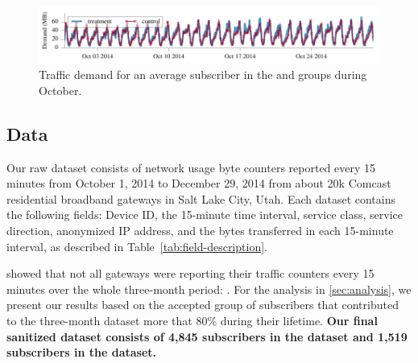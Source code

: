 \begin{figure}[t]
\centering
\includegraphics[width=\linewidth]{figures/traffic_demand_Oct.pdf}
  \caption{Traffic demand for an average subscriber in the \control{} and 
\treatment{} groups during October.\label{fig:traffic-load}}
\end{figure}

\subsection{Data}

Our raw dataset consists of network usage byte counters reported every 15
minutes from October 1, 2014 to December 29, 2014 from about 20k
Comcast residential broadband gateways in Salt Lake City, Utah. Each
dataset contains the following fields: Device ID, the 15-minute time interval,
service class, service direction, anonymized IP address, and the bytes
transferred in each 15-minute interval, as described in
Table~\ref{tab:field-description}.

 showed that not all gateways were
reporting their traffic counters every 15 minutes over the whole three-month
period: .
For the analysis in \autoref{sec:analysis}, we present our results based on the
accepted group of subscribers that contributed to the three-month dataset
more that 80\% during their lifetime. \textbf{Our final sanitized dataset consists of
4,845 subscribers in the \control{} dataset and 1,519 subscribers in the
\treatment{} dataset.}

